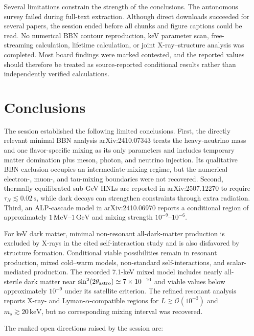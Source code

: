\documentclass[11pt,a4paper]{article}
\begin{document}
Several limitations constrain the strength of the conclusions. The autonomous survey failed during full-text extraction. Although direct downloads succeeded for several papers, the session ended before all chunks and figure captions could be read. No numerical BBN contour reproduction, keV parameter scan, free-streaming calculation, lifetime calculation, or joint X-ray--structure analysis was completed. Most board findings were marked contested, and the reported values should therefore be treated as source-reported conditional results rather than independently verified calculations.

\section{Conclusions}

The session established the following limited conclusions. First, the directly relevant minimal BBN analysis arXiv:2410.07343 treats the heavy-neutrino mass and one flavor-specific mixing as its only parameters and includes temporary matter domination plus meson, photon, and neutrino injection. Its qualitative BBN exclusion occupies an intermediate-mixing regime, but the numerical electron-, muon-, and tau-mixing boundaries were not recovered. Second, thermally equilibrated sub-GeV HNLs are reported in arXiv:2507.12270 to require \(\tau_N\lesssim0.02\,\mathrm{s}\), while dark decays can strengthen constraints through extra radiation. Third, an ALP-cascade model in arXiv:2410.06970 reports a conditional region of approximately \(1\,\mathrm{MeV}\)--\(1\,\mathrm{GeV}\) and mixing strength \(10^{-9}\)--\(10^{-6}\).

For keV dark matter, minimal non-resonant all-dark-matter production is excluded by X-rays in the cited self-interaction study and is also disfavored by structure formation. Conditional viable possibilities remain in resonant production, mixed cold--warm models, non-standard self-interactions, and scalar-mediated production. The recorded 7.1-keV mixed model includes nearly all-sterile dark matter near \(\sin^2(2\theta_{\rm astro})\simeq7\times10^{-10}\) and viable values below approximately \(10^{-9}\) under its satellite criterion. The refined resonant analysis reports X-ray- and Lyman-\(\alpha\)-compatible regions for \(L\gtrsim\mathcal{O}(10^{-3})\) and \(m_s\gtrsim20\,\mathrm{keV}\), but no corresponding mixing interval was recovered.

The ranked open directions raised by the session are:
\end{document}
